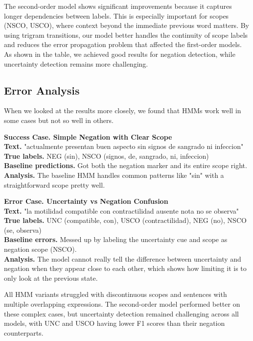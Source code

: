 \documentclass[9pt,a4paper,twoside]{tau-class/tau}
\begin{document}
        The second-order model shows significant improvements because it captures longer dependencies between labels. This is especially important for scopes (NSCO, USCO), where context beyond the immediate previous word matters. By using trigram transitions, our model better handles the continuity of scope labels and reduces the error propagation problem that affected the first-order models. As shown in the table, we achieved good results for negation detection, while uncertainty detection remains more challenging.
    \subsection{Error Analysis}
        When we looked at the results more closely, we found that HMMs work well in some cases but not so well in others.
        
        \begin{tcolorbox}[colback=blue!5, colframe=blue!20, sharp corners, boxrule=0.5pt]
        \textbf{Success Case. Simple Negation with Clear Scope}\\
        \textbf{Text.} "actualmente presentan buen aspecto sin signos de sangrado ni infeccion"\\
        \textbf{True labels.} NEG (sin), NSCO (signos, de, sangrado, ni, infeccion)\\
        \textbf{Baseline predictions.} Got both the negation marker and its entire scope right.\\
        \textbf{Analysis.} The baseline HMM handles common patterns like "sin" with a straightforward scope pretty well.
        \end{tcolorbox}
        
        \begin{tcolorbox}[colback=blue!5, colframe=blue!20, sharp corners, boxrule=0.5pt]
        \textbf{Error Case. Uncertainty vs Negation Confusion}\\
        \textbf{Text.} "la motilidad compatible con contractilidad ausente nota no se observa"\\
        \textbf{True labels.} UNC (compatible, con), USCO (contractilidad), NEG (no), NSCO (se, observa)\\
        \textbf{Baseline errors.} Messed up by labeling the uncertainty cue and scope as negation scope (NSCO).\\
        \textbf{Analysis.} The model cannot really tell the difference between uncertainty and negation when they appear close to each other, which shows how limiting it is to only look at the previous state.
        \end{tcolorbox}
        
        All HMM variants struggled with discontinuous scopes and sentences with multiple overlapping expressions. The second-order model performed better on these complex cases, but uncertainty detection remained challenging across all models, with UNC and USCO having lower F1 scores than their negation counterparts.


\printbibliography

\end{document}
